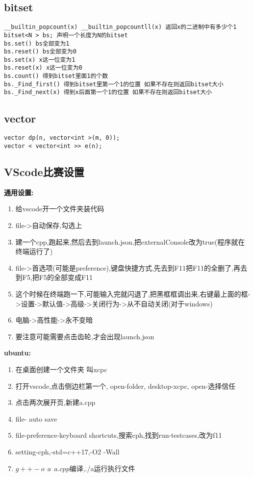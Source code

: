 \documentclass[a4paper, fontset=none]{ctexart}
\begin{document}
\subsection{bitset}

\begin{verbatim}
__builtin_popcount(x) __builtin_popcountll(x) 返回x的二进制中有多少个1
bitset<N > bs; 声明一个长度为N的bitset
bs.set() bs全部变为1
bs.reset() bs全部变为0
bs.set(x) x这一位变为1
bs.reset(x) x这一位变为0
bs.count() 得到bitset里面1的个数
bs._Find_first() 得到bitset里第一个1的位置 如果不存在则返回bitset大小
bs._Find_next(x) 得到x后面第一个1的位置 如果不存在则返回bitset大小
\end{verbatim}
\subsection{vector}

\begin{verbatim}
vector dp(n, vector<int >(m, 0));
vector < vector<int >> e(n);
\end{verbatim}
\subsection{VScode比赛设置}

\textbf{通用设置:}
\begin{enumerate}
\item 给vscode开一个文件夹装代码
\item file->自动保存,勾选上
\item 建一个cpp,跑起来,然后去到launch.json,把externalConsole改为true(程序就在终端运行了)
\item file->首选项(可能是preference),键盘快捷方式,先去到F11把F11的全删了,再去到F5,把F5的全部变成F11
\item 这个时候在终端跑一下,可能输入完就闪退了,把黑框框调出来,右键最上面的框->设置->默认值->高级->关闭行为->从不自动关闭(对于windows)
\item 电脑->高性能->永不变暗
\item 要注意可能需要点击齿轮,才会出现launch.json
\end{enumerate}

\textbf{ubuntu:}
\begin{enumerate}
\item 在桌面创建一个文件夹 叫xcpc
\item 打开vscode,点击侧边栏第一个, open-folder, desktop-xcpc, open-选择信任
\item 点击两次展开页,新建a.cpp
\item file- auto save
\item file-preference-keyboard shortcuts,搜索cph,找到run-testcases,改为f11
\item setting-cph,-std=c++17,-O2 -Wall
\item ${g++ -o \ \ a \ \ a.cpp }$编译,./a运行执行文件
\end{enumerate}
\end{document}
